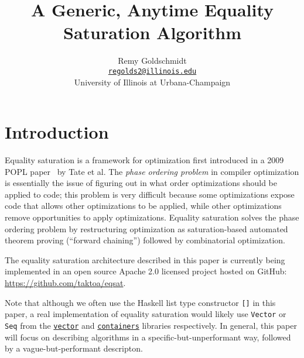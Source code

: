 \documentclass[11pt]{report}
\newcommand{\haskell}[1]{\texttt{#1}}
\newlength{\fixmewidth}
\newcommand{\fixme}[1]{%
  \begin{minipage}[c]{\fixmewidth}%
  \todo[color=green!40,inline]{\textsc{fixme:} #1}%
  \end{minipage}}
\newcommand{\email}[1]{\href{mailto:#1}{\texttt{#1}}}
\newcommand{\hackage}[1]{%
  \href{https://hackage.haskell.org/package/#1}{\texttt{#1}}}
\begin{document}
\title{A Generic, Anytime Equality Saturation Algorithm}
\author{%
  Remy Goldschmidt \\
  \email{regolds2@illinois.edu} \\
  University of Illinois at Urbana-Champaign
}

\maketitle{}

\renewcommand{\baselinestretch}{0.95}\normalsize
\tableofcontents{}
\renewcommand{\baselinestretch}{1.0}\normalsize


\chapter{Introduction}
\label{sec:introduction}

Equality saturation is a framework for optimization first introduced in
a 2009 POPL paper~\cite{tate-2009} by Tate et al.
The \textit{phase ordering problem} in compiler optimization is essentially
the issue of figuring out in what order optimizations should be applied to code;
this problem is very difficult because some optimizations expose code that
allows other optimizations to be applied, while other optimizations remove
opportunities to apply optimizations. Equality saturation solves the phase
ordering problem by restructuring optimization as saturation-based automated
theorem proving (``forward chaining'') followed by combinatorial optimization.

The equality saturation architecture described in this paper is currently being
implemented in an open source Apache 2.0 licensed project hosted on GitHub:
\url{https://github.com/taktoa/eqsat}.

Note that although we often use the Haskell list type constructor \haskell{[]}
in this paper, a real implementation of equality saturation would likely use
\haskell{Vector} or \haskell{Seq} from the \hackage{vector} and
\hackage{containers} libraries respectively. In general, this paper will focus
on describing algorithms in a specific-but-unperformant way, followed by a
vague-but-performant descripton.


\end{document}
